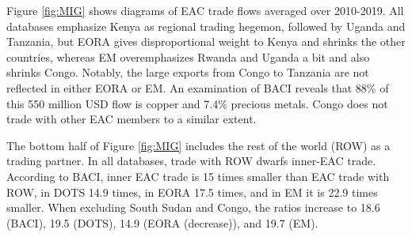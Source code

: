 \documentclass[a4paper]{article}
\begin{document}
Figure \ref{fig:MIG} shows diagrams of EAC trade flows averaged over 2010-2019. All databases emphasize Kenya as regional trading hegemon, followed by Uganda and Tanzania, but EORA gives disproportional weight to Kenya and shrinks the other countries, whereas EM overemphasizes Rwanda and Uganda a bit and also shrinks Congo. Notably, the large exports from Congo to Tanzania are not reflected in either EORA or EM. An examination of BACI reveals that 88\% of this 550 million USD flow is copper and 7.4\% precious metals. Congo does not trade with other EAC members to a similar extent. \newline

 The bottom half of Figure \ref{fig:MIG} includes the rest of the world (ROW) as a trading partner. In all databases, trade with ROW dwarfs inner-EAC trade. According to BACI, inner EAC trade is 15 times smaller than EAC trade with ROW, in DOTS 14.9 times, in EORA 17.5 times, and in EM it is 22.9 times smaller. When excluding South Sudan and Congo, the ratios increase to 18.6 (BACI), 19.5 (DOTS), 14.9 (EORA (decrease)), and 19.7 (EM). \newline
\end{document}
